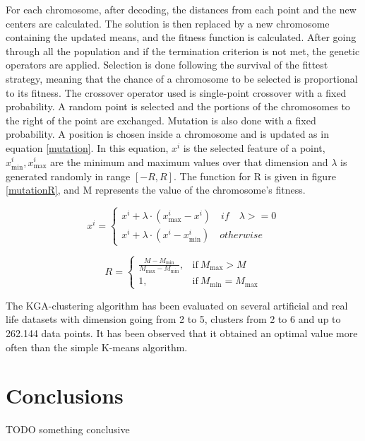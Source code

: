 \documentclass[12pt]{article}
\begin{document}
	For each chromosome, after decoding, the distances from each point and the new centers are calculated. The solution is then replaced by a new chromosome containing the updated means, and the fitness function is calculated. After going through all the population and if the termination criterion is not met, the genetic operators are applied. Selection is done following the survival of the fittest strategy, meaning that the chance of a chromosome to be selected is proportional to its fitness. The crossover operator used is single-point crossover with a fixed probability. A random point is selected and the portions of the chromosomes to the right of the point are exchanged. Mutation is also done with a fixed probability. A position is chosen inside a chromosome and is updated as in equation \ref{mutation}. In this equation, \(x^i\) is the selected feature of a point, \(x_\mathrm{min}^i, x_\mathrm{max}^i\) are the minimum and maximum values over that dimension and $\lambda$ is generated randomly in range \([-R,R]\). The function for R is given in figure \ref{mutationR}, and M represents the value of the chromosome's fitness.
	
	\begin{equation}
		\label{mutation}
		x^i = 
		\begin{cases}
			x^i + \lambda \cdot (x_\mathrm{max}^i - x^i) \quad if \quad \lambda >= 0 \\
			x^i + \lambda \cdot (x^i - x_\mathrm{min}^i) \quad otherwise
		\end{cases} 
	\end{equation}
	
	\begin{equation}
	\label{mutationR}
		R =
			\begin{cases}
			\frac{M - M_\mathrm{min}}{M_\mathrm{max} - M_\mathrm{min}}, & \text{if}\ M_\mathrm{max} > M \\
			1, & \text{if}\ M_\mathrm{min} = M_\mathrm{max}
			\end{cases}
	\end{equation}
	
	The KGA-clustering algorithm has been evaluated on several artificial and real life datasets with dimension going from 2 to 5, clusters from 2 to 6 and up to 262.144 data points. It has been observed that it obtained an optimal value more often than the simple K-means algorithm.
	
	\section{Conclusions}
	TODO something conclusive
	
	\newpage
	
	
\end{document}
